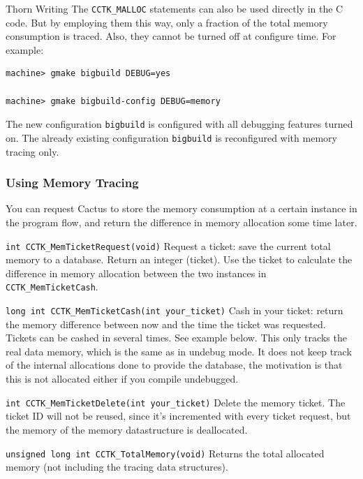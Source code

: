 \begin{cactuspart}{Thorn Writing}
The \texttt{CCTK\_MALLOC} statements can also be used directly in the C
code. But by employing them this way, only a fraction of the total
memory consumption is traced. Also, they cannot be turned off at
configure time. For example:
\begin{verbatim}
machine> gmake bigbuild DEBUG=yes

machine> gmake bigbuild-config DEBUG=memory
\end{verbatim}
The new configuration \texttt{bigbuild} is configured with all debugging
features turned on. The already existing configuration \texttt{bigbuild}
is reconfigured with memory tracing only.

\subsubsection{Using Memory Tracing}
\label{sec:usmetr}

You can  request Cactus to store the memory consumption at a certain
instance in the program flow, and return the difference in memory
allocation some time later.

\begin{Lentry}
\item[\texttt{int CCTK\_MemTicketRequest(void)}]
        Request a ticket: save the current total memory to a database.
        Return an integer (ticket). Use the ticket to calculate the
        difference in memory allocation between the two instances in
        \texttt{CCTK\_MemTicketCash}.

\item[\texttt{long int CCTK\_MemTicketCash(int your\_ticket)}]
        Cash in your ticket: return the memory difference between now and the
        time the ticket was requested. Tickets can be cashed in
        several times. See example below.
        This only tracks the real data memory, which is the same as in
        undebug mode. It does not keep track of the internal allocations
        done to provide the database, the motivation is that this is not
        allocated either if you compile undebugged.

\item[\texttt{int CCTK\_MemTicketDelete(int your\_ticket)}]
        Delete the memory ticket. The ticket ID will not be reused, since
        it's incremented with every ticket request, but the memory of
        the memory datastructure is deallocated.

\item[\texttt{unsigned long int CCTK\_TotalMemory(void)}]
        Returns the total allocated memory (not including the tracing
        data structures).


\end{Lentry}
\end{cactuspart}
